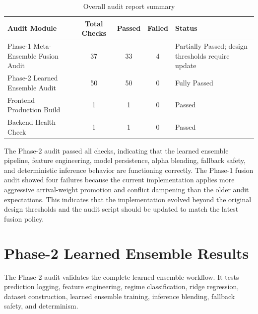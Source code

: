 \documentclass[12pt,a4paper]{report}
\begin{document}
\begin{table}[H]
\centering
\caption{Overall audit report summary}
\label{tab:audit_summary}
\begin{tabular}{|p{4.2cm}|c|c|c|p{4.2cm}|}
\hline
\textbf{Audit Module} & \textbf{Total Checks} & \textbf{Passed} & \textbf{Failed} & \textbf{Status} \\
\hline
Phase-1 Meta-Ensemble Fusion Audit & 37 & 33 & 4 & Partially Passed; design thresholds require update \\
\hline
Phase-2 Learned Ensemble Audit & 50 & 50 & 0 & Fully Passed \\
\hline
Frontend Production Build & 1 & 1 & 0 & Passed \\
\hline
Backend Health Check & 1 & 1 & 0 & Passed \\
\hline
\end{tabular}
\end{table}

The Phase-2 audit passed all checks, indicating that the learned ensemble pipeline, feature engineering, model persistence, alpha blending, fallback safety, and deterministic inference behavior are functioning correctly. The Phase-1 fusion audit showed four failures because the current implementation applies more aggressive arrival-weight promotion and conflict dampening than the older audit expectations. This indicates that the implementation evolved beyond the original design thresholds and the audit script should be updated to match the latest fusion policy.

\section{Phase-2 Learned Ensemble Results}

The Phase-2 audit validates the complete learned ensemble workflow. It tests prediction logging, feature engineering, regime classification, ridge regression, dataset construction, learned ensemble training, inference blending, fallback safety, and determinism.
\end{document}
